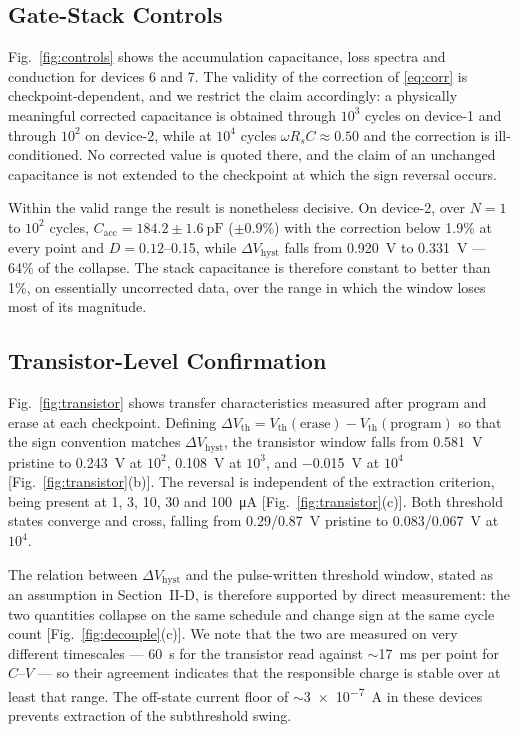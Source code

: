 \documentclass[journal]{IEEEtran}
\newcommand{\rev}[1]{{\color{blue}#1}}      %
\newcommand{\Vth}{V_{\mathrm{th}}}
\newcommand{\dVh}{\Delta V_{\mathrm{hyst}}}
\newcommand{\Cacc}{C_{\mathrm{acc}}}
\newcommand{\Rs}{R_s}
\begin{document}
\subsection{Gate-Stack Controls}
\rev{Fig.~\ref{fig:controls} shows the accumulation capacitance, loss
spectra and conduction for devices 6 and 7. The validity of the
correction of \eqref{eq:corr} is checkpoint-dependent, and we restrict
the claim accordingly: a physically meaningful corrected capacitance is
obtained through $10^3$ cycles on device-1 and through $10^2$ on
device-2, while at $10^4$ cycles $\omega\Rs C\approx0.50$ and the
correction is ill-conditioned. No corrected value is quoted there, and
the claim of an unchanged capacitance is not extended to the checkpoint
at which the sign reversal occurs.

Within the valid range the result is nonetheless decisive. On device-2,
over $N=1$ to $10^2$ cycles, $\Cacc=184.2\pm\SI{1.6}{\pico\farad}$
($\pm0.9$\%) with the correction below 1.9\% at every point and
$D=0.12$--0.15, while $\dVh$ falls from \SI{0.920}{\volt} to
\SI{0.331}{\volt} --- 64\% of the collapse. The stack capacitance is
therefore constant to better than 1\%, on essentially uncorrected data,
over the range in which the window loses most of its magnitude.}

\subsection{Transistor-Level Confirmation}
\rev{Fig.~\ref{fig:transistor} shows transfer characteristics measured
after program and erase at each checkpoint. Defining
$\Delta\Vth=\Vth(\text{erase})-\Vth(\text{program})$ so that the sign
convention matches $\dVh$, the transistor window falls from
\SI{+0.581}{\volt} pristine to \SI{+0.243}{\volt} at $10^2$,
\SI{+0.108}{\volt} at $10^3$, and \SI{-0.015}{\volt} at $10^4$
[Fig.~\ref{fig:transistor}(b)]. The reversal is independent of the
extraction criterion, being present at 1, 3, 10, 30 and
\SI{100}{\micro\ampere} [Fig.~\ref{fig:transistor}(c)]. Both threshold
states converge and cross, falling from 0.29/\SI{0.87}{\volt} pristine
to 0.083/\SI{0.067}{\volt} at $10^4$.

The relation between $\dVh$ and the pulse-written threshold window,
stated as an assumption in Section~II-D, is therefore supported by
direct measurement: the two quantities collapse on the same schedule and
change sign at the same cycle count [Fig.~\ref{fig:decouple}(c)]. We
note that the two are measured on very different timescales ---
\SI{60}{\second} for the transistor read against
$\sim$\SI{17}{\milli\second} per point for $C$--$V$ --- so their
agreement indicates that the responsible charge is stable over at least
that range. The off-state current floor of
$\sim$\SI{3e-7}{\ampere} in these devices prevents extraction of the
subthreshold swing.}
\end{document}
